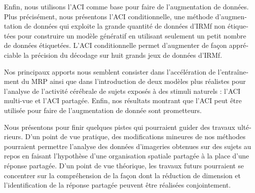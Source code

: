 \begin{otherlanguage}{french}
Enfin, nous utilisons l'ACI comme base pour faire de l'augmentation de données. Plus précisément, nous présentons l’ACI conditionnelle, une méthode d'augmentation de données qui exploite la grande quantité de données d'IRMf non étiquetées pour construire un modèle génératif en utilisant seulement un petit nombre de données étiquetées. L’ACI conditionnelle permet d'augmenter de façon appréciable la précision du décodage sur huit grands jeux de données d'IRMf.

Nos principaux apports nous semblent consister dans l’accélération de l’entraînement du MRP ainsi que dans l’introduction de deux modèles plus réalistes pour l’analyse de l’activité cérébrale de sujets exposés à des stimuli naturels : l’ACI multi-vue et l’ACI partagée. Enfin, nos résultats montrant que l’ACI peut être utilisée pour faire de l’augmentation de donnée sont prometteurs.

Nous présentons pour finir quelques pistes qui pourraient guider des travaux
ultérieurs. D’un point de vue pratique, des modifications mineures de nos
méthodes pourraient permettre l’analyse des données d’imageries obtenues sur des
sujets au repos en faisant l’hypothèse d’une organisation spatiale partagée à la
place d’une réponse partagée. D’un point de vue théorique, les travaux futurs
pourraient se concentrer sur la compréhension de la façon dont la réduction de
dimension et l'identification de la réponse partagée peuvent être réalisées
conjointement.
\end{otherlanguage}

\endgroup

\vfill
